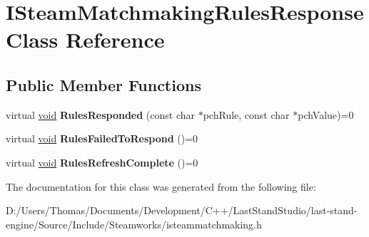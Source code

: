 \hypertarget{classISteamMatchmakingRulesResponse}{}\section{I\+Steam\+Matchmaking\+Rules\+Response Class Reference}
\label{classISteamMatchmakingRulesResponse}
\subsection*{Public Member Functions}
\begin{DoxyCompactItemize}
\item 
\hypertarget{classISteamMatchmakingRulesResponse_a0d9557ebe60d3633a4753e9548b0f4e6}{}virtual \hyperlink{SDL__audio_8h_a52835ae37c4bb905b903cbaf5d04b05f}{void} {\bfseries Rules\+Responded} (const char $\ast$pch\+Rule, const char $\ast$pch\+Value)=0\label{classISteamMatchmakingRulesResponse_a0d9557ebe60d3633a4753e9548b0f4e6}

\item 
\hypertarget{classISteamMatchmakingRulesResponse_a17bd5325098ea4ee47a87c30441d0a03}{}virtual \hyperlink{SDL__audio_8h_a52835ae37c4bb905b903cbaf5d04b05f}{void} {\bfseries Rules\+Failed\+To\+Respond} ()=0\label{classISteamMatchmakingRulesResponse_a17bd5325098ea4ee47a87c30441d0a03}

\item 
\hypertarget{classISteamMatchmakingRulesResponse_a139e44013499588321c04a907d33dc9b}{}virtual \hyperlink{SDL__audio_8h_a52835ae37c4bb905b903cbaf5d04b05f}{void} {\bfseries Rules\+Refresh\+Complete} ()=0\label{classISteamMatchmakingRulesResponse_a139e44013499588321c04a907d33dc9b}

\end{DoxyCompactItemize}


The documentation for this class was generated from the following file\+:\begin{DoxyCompactItemize}
\item 
D\+:/\+Users/\+Thomas/\+Documents/\+Development/\+C++/\+Last\+Stand\+Studio/last-\/stand-\/engine/\+Source/\+Include/\+Steamworks/isteammatchmaking.\+h\end{DoxyCompactItemize}
